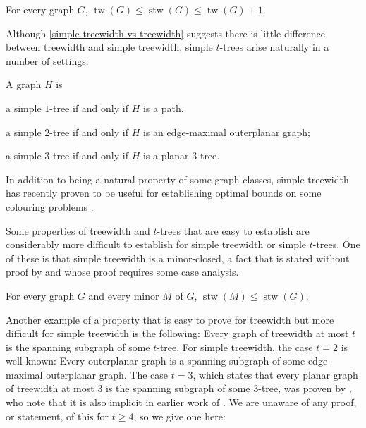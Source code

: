 \documentclass[kpfonts]{patmorin}
\DeclareMathOperator{\tw}{tw}
\DeclareMathOperator{\stw}{stw}
\theoremstyle{named}
\begin{document}
\begin{lem}\label{simple-treewidth-vs-treewidth}\cite{knauer.ueckerdt:simple}
    For every graph $G$, $\tw(G)\le \stw(G)\le \tw(G)+1$.
\end{lem}

Although \cref{simple-treewidth-vs-treewidth} suggests there is little difference between treewidth and simple treewidth, simple $t$-trees arise naturally in a number of settings:

\begin{lem}\label{simple-small-cases}
    A graph $H$ is
    \begin{compactenum}[(i)]
        \item a simple $1$-tree if and only if $H$ is a path.
        \item a simple $2$-tree if and only if $H$ is an edge-maximal outerplanar graph;
        \item a simple $3$-tree if and only if $H$ is a planar 3-tree.
    \end{compactenum}
\end{lem}

In addition to being a natural property of some graph classes, simple treewidth has recently proven to be useful for establishing optimal bounds on some colouring problems \cite{bose.dujmovic.ea:asymptotically}.

Some properties of treewidth and $t$-trees that are easy to establish are considerably more difficult to establish for simple treewidth or simple $t$-trees.  One of these is that simple treewidth is a minor-closed, a fact that is stated without proof by \citet{knauer.ueckerdt:simple} and whose proof requires some case analysis.

\begin{lem}\label{simple-minor-closed}
    For every graph $G$ and every minor $M$ of $G$, $\stw(M)\le\stw(G)$.
\end{lem}


Another example of a property that is easy to prove for treewidth but more difficult for simple treewidth is the following:  Every graph of treewidth at most $t$ is the spanning subgraph of some $t$-tree.  For simple treewidth, the case $t=2$ is well known: Every outerplanar graph is a spanning subgraph of some edge-maximal outerplanar graph.  The case $t=3$, which states that every planar graph of treewidth at most 3 is the spanning subgraph of some $3$-tree, was proven by \citet{kratochvil.vaner:note}, who note that it is also implicit in earlier work of \citet{elmallah.colbourn:on}.  We are unaware of any proof, or statement, of this for $t\ge 4$, so we give one here:
\end{document}
